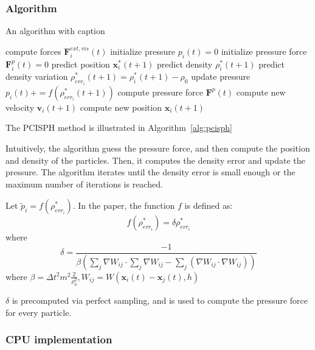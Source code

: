 \documentclass[acmtog]{acmart}
\begin{document}
\subsubsection{Algorithm}

\begin{algorithm}
	\caption{An algorithm with caption}\label{alg:pcisph}
	\begin{algorithmic}
		\State compute forces $\boldsymbol{F}^{ext, vis}_i(t)$
		\State initialize pressure $p_i(t)=0$
		\State initialize pressure force $\boldsymbol{F}^p_i(t)=0$
		\EndFor
		\State predict position $\boldsymbol{x}_i^*(t+1)$
		\EndFor
		\State predict density $\rho_i^*(t+1)$
		\State predict density variation $\rho_{{err}_i}^*(t+1) = \rho_i^*(t+1) - \rho_0$
		\State update pressure $p_i(t) += f(\rho_{{err}_i}^*(t+1))$
		\EndFor
		\State compute pressure force $\boldsymbol{F}^p(t)$
		\EndFor
		\EndWhile
		\State compute new velocity $\boldsymbol{v}_i(t+1)$
		\State compute new position $\boldsymbol{x}_i(t+1)$
		\EndFor
		\EndWhile
	\end{algorithmic}
\end{algorithm}

The PCISPH method is illustrated in Algorithm~\ref{alg:pcisph}

Intuitively, the algorithm guess the pressure force, and then compute the position and density of the particles. Then, it computes the density error and update the pressure. The algorithm iterates until the density error is small enough or the maximum number of iterations is reached.

Let $\tilde{p}_i = f(\rho_{err_i}^*)$.
In the paper, the function $f$ is defined as:
\[
	f(\rho_{err_i}^*) = \delta \rho_{err_i}^*
\]
where
\[
	\delta = \frac{-1}{\beta(\sum_j \nabla W_{ij} \cdot \sum_j \nabla W_{ij} - \sum_j(\nabla W_{ij}\cdot \nabla W_{ij}))}
\]
where $\beta = \Delta t^2 m^2 \frac{2}{\rho_0^2}, W_{ij} = W(\boldsymbol{x}_i(t) - \boldsymbol{x}_j(t), h)$

$\delta$ is precomputed via perfect sampling, and is used to compute the pressure force for every particle.

\subsubsection{CPU implementation}
\end{document}
